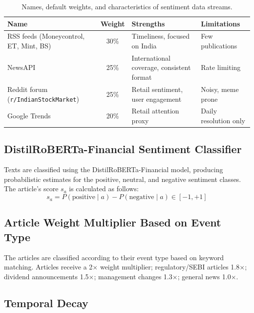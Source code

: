 \documentclass[10pt,a4paper,twoside]{article}
\begin{document}
\begin{table}[htb]
  \begin{center}
    {\caption{Names, default weights, and characteristics of sentiment data streams.}
    \label{tab:sentiment}}
    \begin{tabular}{|l|c|l|l|}
    \hline
    \textbf{Name} & \textbf{Weight} & \textbf{Strengths} & \textbf{Limitations} \\
    \hline
    RSS feeds (Moneycontrol, ET, Mint, BS) & 30\% & Timeliness, focused on India & Few publications \\
    NewsAPI & 25\% & International coverage, consistent format & Rate limiting \\
    Reddit forum (\texttt{r/IndianStockMarket}) & 25\% & Retail sentiment, user engagement & Noisy, meme prone \\
    Google Trends & 20\% & Retail attention proxy & Daily resolution only \\
    \hline
    \end{tabular}
  \end{center}
\end{table}

\subsection{DistilRoBERTa-Financial Sentiment Classifier}

Texts are classified using the DistilRoBERTa-Financial model, producing probabilistic estimates for the positive, neutral, and negative sentiment classes. The article's score $s_a$ is calculated as follows:
\begin{equation}
  s_a = P(\text{positive} \mid a) - P(\text{negative} \mid a) \in [-1, +1]
\end{equation}

\subsection{Article Weight Multiplier Based on Event Type}

The articles are classified according to their event type based on keyword matching. Articles receive a 2$\times$ weight multiplier; regulatory/SEBI articles 1.8$\times$;
dividend announcements 1.5$\times$; management changes 1.3$\times$; general
news 1.0$\times$.

\subsection{Temporal Decay}
\end{document}
